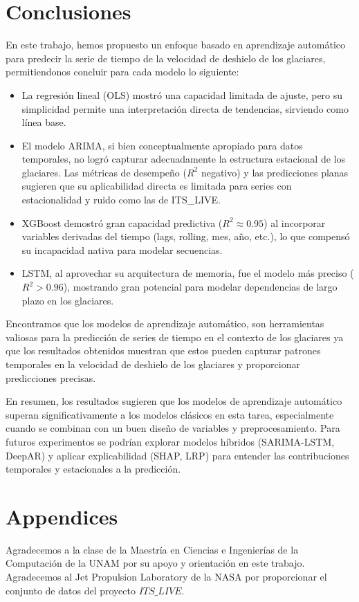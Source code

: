 \documentclass[sigconf,language=spanish]{acmart}
\begin{document}
\section{Conclusiones}

En este trabajo, hemos propuesto un enfoque basado en aprendizaje automático para predecir la serie de tiempo de la velocidad de deshielo de los glaciares, permitiendonos concluir para
cada modelo lo siguiente:
\begin{itemize}
  \item La regresión lineal (OLS) mostró una capacidad limitada de ajuste, pero su simplicidad permite una interpretación directa de tendencias, sirviendo como línea base.
  \item El modelo ARIMA, si bien conceptualmente apropiado para datos temporales, no logró capturar adecuadamente la estructura estacional de los glaciares. Las métricas de 
desempeño ($R^2$ negativo) y las predicciones planas sugieren que su aplicabilidad directa es limitada para series con estacionalidad y ruido como las de ITS\_LIVE.
  \item XGBoost demostró gran capacidad predictiva ($R^2 \approx 0.95$) al incorporar variables derivadas del tiempo (lags, rolling, mes, año, etc.), lo que compensó su incapacidad nativa para modelar secuencias.
  \item LSTM, al aprovechar su arquitectura de memoria, fue el modelo más preciso ($R^{2} > 0.96$), mostrando gran potencial para modelar dependencias de largo plazo en los glaciares.

  \end{itemize}
Encontramos que los modelos de aprendizaje automático, son herramientas valiosas para la predicción de series de tiempo en el contexto de los glaciares ya que los resultados obtenidos muestran que estos  
pueden capturar patrones temporales en la velocidad de deshielo de los glaciares y proporcionar predicciones precisas.

En resumen, los resultados sugieren que los modelos de aprendizaje automático superan significativamente a los modelos clásicos en esta tarea, especialmente cuando se combinan con un buen diseño de variables y preprocesamiento. 
Para futuros experimentos  se podrían explorar modelos híbridos (SARIMA-LSTM, DeepAR) y aplicar explicabilidad (SHAP, LRP) para entender las contribuciones temporales y estacionales a la predicción.

\section{Appendices}
\begin{acks}
Agradecemos a la clase de la Maestría en Ciencias e Ingenierías de la Computación de la UNAM por su apoyo y orientación en este trabajo.
Agradecemos al Jet Propulsion Laboratory de la NASA por proporcionar el conjunto de datos del proyecto  $ITS\_LIVE$.
\end{acks}




\appendix
\end{document}

